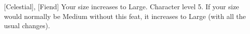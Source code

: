  {[Celestial], [Fiend]}
\shortdescfeat
{Your size increases to Large.}
{Character level 5.}
{If your size would normally be Medium without this feat, it increases to Large (with all the usual changes).}